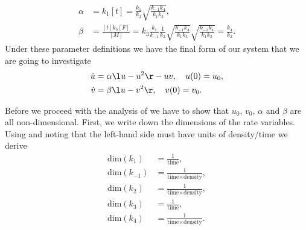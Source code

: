 \begin{example}[frametitle=Fishing]
{\begin{align}
\alpha&=k_1[t]=\frac{k_1}{k_2}\sqrt{\frac{k_{-1}k_4}{k_1k_3}},\nonumber\\
\beta&=\frac{[t]k_3[F]}{[M]}=k_3\frac{k_1}{k_{-1}}\frac{1}{k_2}\sqrt{\frac{k_{-1}k_4}{k_1k_3}}\sqrt{\frac{k_{-1}k_4}{k_1k_3}}=\frac{k_4}{k_2}.\nonumber
\end{align}
Under these parameter definitions we have the final form of our system that we are going to investigate
\begin{align}
\dot{u}&=\alpha\l u-u^2\r-uv, \quad u(0)=u_0,\label{Non_dim_fish_1}\\
\dot{v}&=\beta\l u-v^2\r,\quad v(0)=v_0.\label{Non_dim_fish_2}
\end{align}

Before we proceed with the analysis of  we have to show that $u_0$, $v_0$, $\alpha$ and $\beta$ are all non-dimensional. First, we write down the dimensions of the rate variables. Using  and noting that the left-hand side must have units of density/time we derive
\begin{align}
\textrm{dim}(k_1)&=\frac{1}{\textrm{time}},\nonumber\\
\textrm{dim}(k_{-1})&=\frac{1}{\textrm{time}\times \textrm{density}},\nonumber\\
\textrm{dim}(k_{2})&=\frac{1}{\textrm{time}\times \textrm{density}},\nonumber\\
\textrm{dim}(k_{3})&=\frac{1}{\textrm{time}},\nonumber\\
\textrm{dim}(k_{4})&=\frac{1}{\textrm{time}\times \textrm{density}}.\nonumber
\end{align}
}
\end{example}
